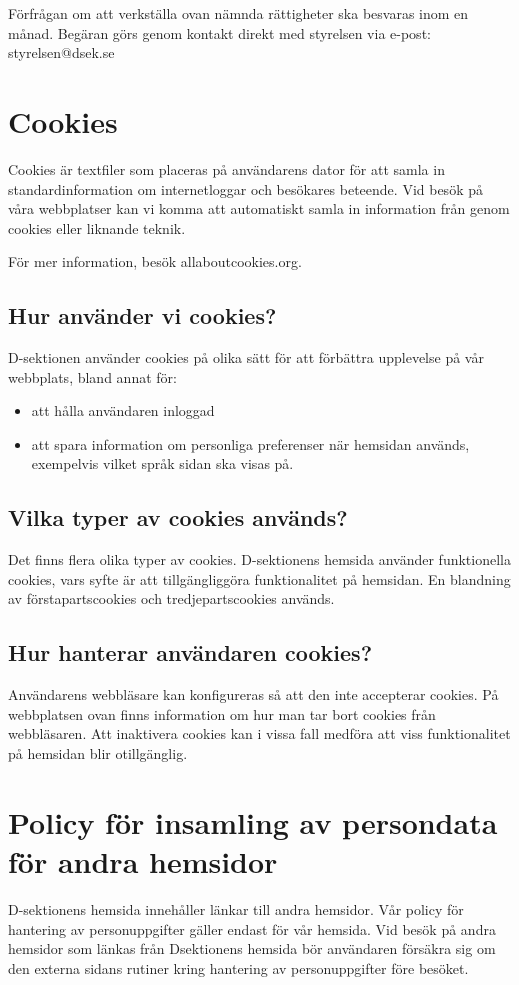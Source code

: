 \documentclass{dsekprotokoll}
\begin{document}
Förfrågan om att verkställa ovan nämnda rättigheter ska besvaras inom en månad. Begäran görs genom kontakt direkt med styrelsen via e-post: styrelsen@dsek.se

\section{Cookies}
Cookies är textfiler som placeras på användarens dator för att samla in standardinformation om internetloggar och besökares beteende. Vid besök på våra webbplatser kan vi komma att automatiskt samla in information från genom cookies eller liknande teknik.


För mer information, besök allaboutcookies.org.

\subsection{Hur använder vi cookies?}
D-sektionen använder cookies på olika sätt för att förbättra upplevelse på vår webbplats, bland
annat för:
\begin{itemize}
    \item att hålla användaren inloggad
    \item att spara information om personliga preferenser när hemsidan används, exempelvis vilket språk sidan ska visas på.
\end{itemize}
\subsection{Vilka typer av cookies används?}
Det finns flera olika typer av cookies. D-sektionens hemsida använder funktionella cookies,
vars syfte är att tillgängliggöra funktionalitet på hemsidan. En blandning av förstapartscookies
och tredjepartscookies används.

\subsection{Hur hanterar användaren cookies?}
Användarens webbläsare kan konfigureras så att den inte accepterar cookies. På webbplatsen
ovan finns information om hur man tar bort cookies från webbläsaren. Att inaktivera cookies
kan i vissa fall medföra att viss funktionalitet på hemsidan blir otillgänglig.

\section{Policy för insamling av persondata för andra hemsidor}
D-sektionens hemsida innehåller länkar till andra hemsidor. Vår policy för hantering av personuppgifter gäller endast för vår hemsida. Vid besök på andra hemsidor som länkas från Dsektionens hemsida bör användaren försäkra sig om den externa sidans rutiner kring hantering
av personuppgifter före besöket.
\end{document}
